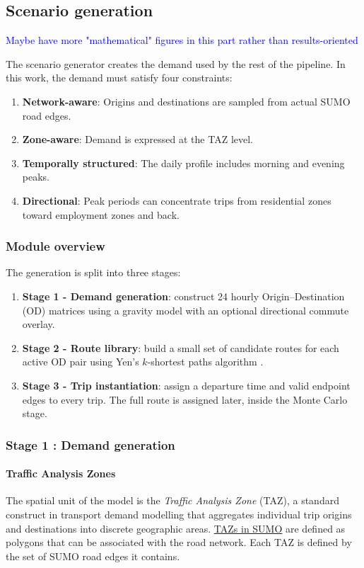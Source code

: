 \subsection{Scenario generation}

\textcolor{blue}{Maybe have more "mathematical" figures in this part rather than results-oriented}

The scenario generator creates the demand used by the rest of the pipeline. In
this work, the demand must satisfy four constraints:
\begin{enumerate}
\item \textbf{Network-aware}: Origins and destinations are sampled from actual
      SUMO road edges.
\item \textbf{Zone-aware}: Demand is expressed at the TAZ level.
\item \textbf{Temporally structured}: The daily profile includes morning and
      evening peaks.
\item \textbf{Directional}: Peak periods can concentrate trips from
      residential zones toward employment zones and back.
\end{enumerate}

\subsubsection{Module overview}
The generation is split into three stages:
\begin{enumerate}
  \item \textbf{Stage 1 - Demand generation}: construct 24 hourly
        Origin\nobreakdash–Destination (OD) matrices using a gravity model
        with an optional directional commute overlay.
  \item \textbf{Stage 2 - Route library}: build a small set of candidate
        routes for each active OD pair using Yen's $k$-shortest
        paths algorithm \cite{yen_algorithm}.
  \item \textbf{Stage 3 - Trip instantiation}: assign a departure time
        and valid endpoint edges to every trip. The full route is assigned
        later, inside the Monte Carlo stage.
\end{enumerate}

\subsubsection{Stage 1 : Demand generation}

\paragraph{Traffic Analysis Zones}
The spatial unit of the model is the \emph{Traffic Analysis Zone} (TAZ),
a standard construct in transport demand modelling that aggregates individual
trip origins and destinations into discrete geographic areas.  
\href{https://sumo.dlr.de/docs/Contributed/SUMOPy/Demand/Zone_To_Zone.html}{TAZs in SUMO} 
are defined as polygons that can be associated with the road network.
Each TAZ is defined by the set of SUMO road edges it contains.

